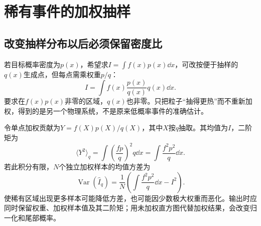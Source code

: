 \section{稀有事件的加权抽样}
\subsection{改变抽样分布以后必须保留密度比}
若目标概率密度为$p(x)$，希望求$I=\int f(x)p(x)\dd x$，可改按便于抽样的$q(x)$生成点，但每点需乘权重$p/q$：
\[
 I=\int f(x)\frac{p(x)}{q(x)}q(x)\dd x.
\]
要求在$f(x)p(x)$非零的区域，$q(x)$也非零。只把粒子“抽得更热”而不重新加权，得到的是另一个物理系统，不是原来低概率事件的准确估计。

令单点加权贡献为$Y=f(X)p(X)/q(X)$，其中$X$按$q$抽取。其均值为$I$，二阶矩为
\[
\langle Y^2\rangle_q
=\int\left(\frac{fp}{q}\right)^2q\dd x
=\int\frac{f^2p^2}{q}\dd x.
\]
若此积分有限，$N$个独立加权样本的均值方差为
\[
\operatorname{Var}(\widehat I_q)
=\frac1N\left(\int\frac{f^2p^2}{q}\dd x-I^2\right).
\]
使稀有区域出现更多样本可能降低方差，也可能因少数极大权重而恶化。输出时应同时保留权重、加权样本值及其二阶矩；用未加权直方图代替加权结果，会改变归一化和尾部概率。

